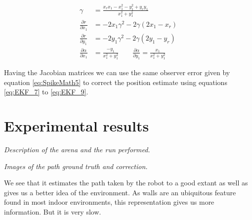 \begin{subequations}
\label{eq:lineModel6}
	\begin{align}	
	\gamma &= \frac{x_rx_1-x_1^2-y_1^2+y_ry_1}{x_1^2+y_1^2} \\
	\frac{\partial r}{\partial x_1} &= 
	-2x_1\gamma^2 - 2\gamma(2x_1-x_r) \\
	\frac{\partial r}{\partial y_1} &= 
	-2y_1\gamma^2 - 2\gamma(2y_1-y_r)	\\
	\frac{\partial \alpha}{\partial x_1} &=  \frac{-y_1}{x_1^2+y_1^2}\qquad
	\frac{\partial \alpha}{\partial y_1} =
	\frac{x_1}{x_1^2+y_1^2} 
	\end{align}
\end{subequations}

Having the Jacobian matrices we can use the same observer error given by equation \ref{eq:SpikeMath5} to correct the position estimate using equations \ref{eq:EKF_7} to \ref{eq:EKF_9}.

\section{Experimental results}
\textit{Description of the arena and the run performed.}

\textit{Images of the path ground truth and correction.}

We see that it estimates the path taken by the robot to a good extant as well as gives us a better idea of the environment. As walls are an ubiquitous feature found in most indoor environments, this representation gives us more information. But it is very slow. 
 